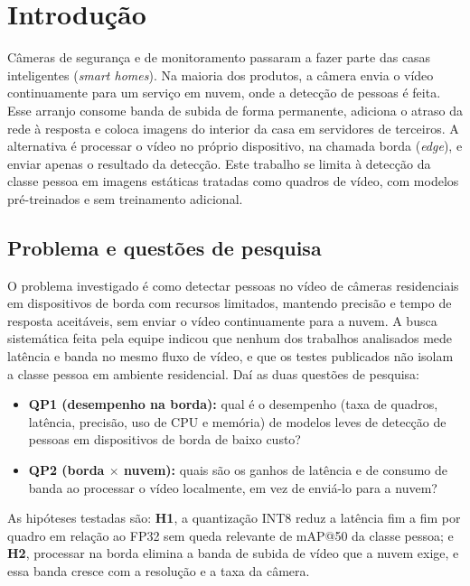 \section{Introdução}
\label{introducao}

Câmeras de segurança e de monitoramento passaram a fazer parte das casas inteligentes (\textit{smart homes}). Na maioria dos produtos, a câmera envia o vídeo continuamente para um serviço em nuvem, onde a detecção de pessoas é feita. Esse arranjo consome banda de subida de forma permanente, adiciona o atraso da rede à resposta e coloca imagens do interior da casa em servidores de terceiros. A alternativa é processar o vídeo no próprio dispositivo, na chamada borda (\textit{edge}), e enviar apenas o resultado da detecção. Este trabalho se limita à detecção da classe pessoa em imagens estáticas tratadas como quadros de vídeo, com modelos pré-treinados e sem treinamento adicional.

\subsection{Problema e questões de pesquisa}

O problema investigado é como detectar pessoas no vídeo de câmeras residenciais em dispositivos de borda com recursos limitados, mantendo precisão e tempo de resposta aceitáveis, sem enviar o vídeo continuamente para a nuvem. A busca sistemática feita pela equipe  indicou que nenhum dos trabalhos analisados mede latência e banda no mesmo fluxo de vídeo, e que os testes publicados não isolam a classe pessoa em ambiente residencial. Daí as duas questões de pesquisa:

\begin{itemize}
    \item \textbf{QP1 (desempenho na borda):} qual é o desempenho (taxa de quadros, latência, precisão, uso de CPU e memória) de modelos leves de detecção de pessoas em dispositivos de borda de baixo custo?
    \item \textbf{QP2 (borda $\times$ nuvem):} quais são os ganhos de latência e de consumo de banda ao processar o vídeo localmente, em vez de enviá-lo para a nuvem?
\end{itemize}

As hipóteses testadas são: \textbf{H1}, a quantização INT8 reduz a latência fim a fim por quadro em relação ao FP32 sem queda relevante de mAP@50 da classe pessoa; e \textbf{H2}, processar na borda elimina a banda de subida de vídeo que a nuvem exige, e essa banda cresce com a resolução e a taxa da câmera. 

